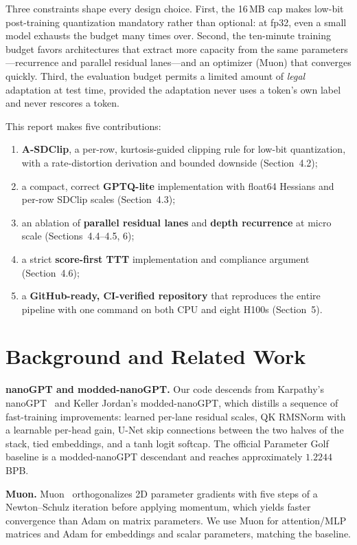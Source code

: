 \documentclass[10pt]{article}
\begin{document}
Three constraints shape every design choice. First, the 16\,MB cap makes low-bit
post-training quantization mandatory rather than optional: at fp32, even a small model
exhausts the budget many times over. Second, the ten-minute training budget favors
architectures that extract more capacity from the same parameters---recurrence and
parallel residual lanes---and an optimizer (Muon) that converges quickly. Third, the
evaluation budget permits a limited amount of \emph{legal} adaptation at test time,
provided the adaptation never uses a token's own label and never rescores a token.

This report makes five contributions:
\begin{enumerate}[leftmargin=1.6em,itemsep=0.1em]
\item \textbf{A-SDClip}, a per-row, kurtosis-guided clipping rule for low-bit
quantization, with a rate-distortion derivation and bounded downside (Section~4.2);
\item a compact, correct \textbf{GPTQ-lite} implementation with float64 Hessians and
per-row SDClip scales (Section~4.3);
\item an ablation of \textbf{parallel residual lanes} and \textbf{depth recurrence} at
micro scale (Sections~4.4--4.5, 6);
\item a strict \textbf{score-first TTT} implementation and compliance argument
(Section~4.6);
\item a \textbf{GitHub-ready, CI-verified repository} that reproduces the entire
pipeline with one command on both CPU and eight H100s (Section~5).
\end{enumerate}

\section{Background and Related Work}

\textbf{nanoGPT and modded-nanoGPT.} Our code descends from Karpathy's
nanoGPT~\citep{karpathy_nanogpt} and Keller Jordan's modded-nanoGPT, which distills a
sequence of fast-training improvements: learned per-lane residual scales, QK RMSNorm
with a learnable per-head gain, U-Net skip connections between the two halves of the
stack, tied embeddings, and a tanh logit softcap. The official Parameter Golf baseline
is a modded-nanoGPT descendant and reaches approximately $1.2244$ BPB.

\textbf{Muon.} Muon~\citep{jordan_muon} orthogonalizes 2D parameter gradients with five
steps of a Newton--Schulz iteration before applying momentum, which yields faster
convergence than Adam on matrix parameters. We use Muon for attention/MLP matrices and
Adam for embeddings and scalar parameters, matching the baseline.
\end{document}
